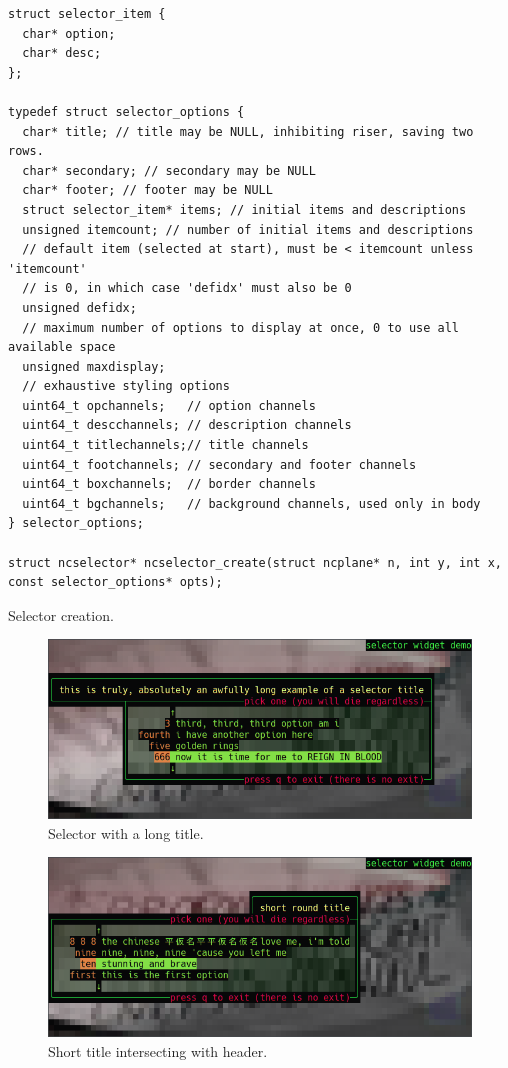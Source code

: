 \documentclass[letterpaper,10pt]{article}
\begin{document}
\begin{listing}[!htb]
\begin{verbatim}
struct selector_item {
  char* option;
  char* desc;
};

typedef struct selector_options {
  char* title; // title may be NULL, inhibiting riser, saving two rows.
  char* secondary; // secondary may be NULL
  char* footer; // footer may be NULL
  struct selector_item* items; // initial items and descriptions
  unsigned itemcount; // number of initial items and descriptions
  // default item (selected at start), must be < itemcount unless 'itemcount'
  // is 0, in which case 'defidx' must also be 0
  unsigned defidx;
  // maximum number of options to display at once, 0 to use all available space
  unsigned maxdisplay;
  // exhaustive styling options
  uint64_t opchannels;   // option channels
  uint64_t descchannels; // description channels
  uint64_t titlechannels;// title channels
  uint64_t footchannels; // secondary and footer channels
  uint64_t boxchannels;  // border channels
  uint64_t bgchannels;   // background channels, used only in body
} selector_options;

struct ncselector* ncselector_create(struct ncplane* n, int y, int x, const selector_options* opts);
\end{verbatim}
\caption{Selector creation.}
\end{listing}

\begin{figure}
    \centering
    \includegraphics[width=.75\linewidth]{media/selector1.png}
    \caption{Selector with a long title.}
\end{figure}

\begin{figure}
    \centering
    \includegraphics[width=.75\linewidth]{media/selector2.png}
    \caption{Short title intersecting with header.}
\end{figure}
\end{document}
